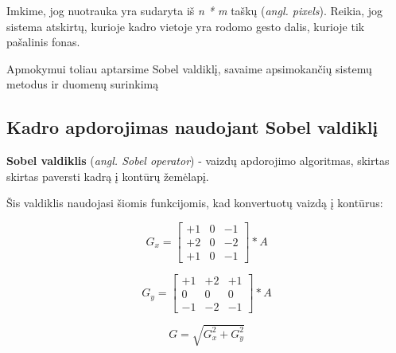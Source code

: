 \documentclass{VUMIFInfKursinis}
\begin{document}
Imkime, jog nuotrauka yra sudaryta iš \textit{n * m} taškų (\textit{angl. pixels}). Reikia, jog sistema atskirtų, kurioje kadro vietoje yra rodomo gesto dalis, kurioje tik pašalinis fonas.

Apmokymui toliau aptarsime Sobel valdiklį, savaime apsimokančių sistemų metodus ir duomenų surinkimą 

\subsection{Kadro apdorojimas naudojant Sobel valdiklį}
\textbf{Sobel valdiklis} (\textit{angl. Sobel operator}) - vaizdų apdorojimo algoritmas, skirtas skirtas paversti kadrą į kontūrų žemėlapį.

Šis valdiklis naudojasi šiomis funkcijomis, kad konvertuotų vaizdą į kontūrus:

\begin{equation}\label{eq:sobelgx}
	G_x = 
	\begin{bmatrix}
	+1 & 0 & -1 \\
	+2 & 0 & -2 \\
	+1 & 0 & -1
	\end{bmatrix} * A
\end{equation}
	
\begin{equation}\label{eq:sobelgy}
	G_y = 
	\begin{bmatrix}
	+1 & +2 & +1 \\
	0 & 0 & 0 \\
	-1 & -2 & -1
	\end{bmatrix} * A
\end{equation}

\begin{equation}\label{eq:sobelg}
G = \sqrt{G_x^2 + G_y^2}
\end{equation}
\end{document}
